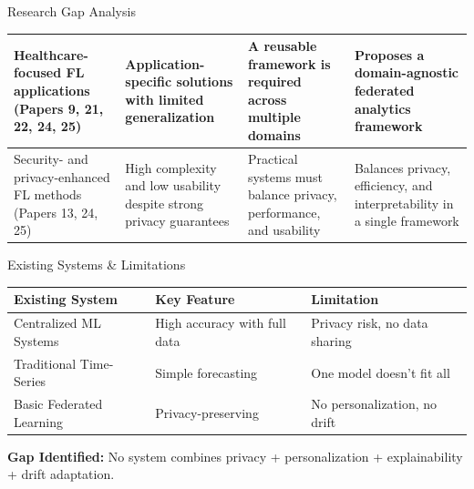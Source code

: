 \documentclass[aspectratio=169, 11pt]{beamer}
\begin{document}
\begin{frame}{Research Gap Analysis}
{\begin{tabular}{p{3.8cm}p{4.2cm}p{4.4cm}p{4.2cm}}
\midrule
Healthcare-focused FL applications
(Papers 9, 21, 22, 24, 25) &
Application-specific solutions with limited generalization &
A reusable framework is required across multiple domains &
Proposes a domain-agnostic federated analytics framework \\

\midrule
Security- and privacy-enhanced FL methods
(Papers 13, 24, 25) &
High complexity and low usability despite strong privacy guarantees &
Practical systems must balance privacy, performance, and usability &
Balances privacy, efficiency, and interpretability in a single framework \\

\bottomrule
\end{tabular}
}
\end{frame}

\begin{frame}{Existing Systems \& Limitations}
    \begin{table}
        \centering
        \begin{tabular}{l l l}
            \toprule
            \textbf{Existing System} & \textbf{Key Feature} & \textbf{Limitation} \\
            \midrule
            Centralized ML Systems & High accuracy with full data & Privacy risk, no data sharing \\
            Traditional Time-Series & Simple forecasting & One model doesn't fit all \\
            Basic Federated Learning & Privacy-preserving & No personalization, no drift \\
            \bottomrule
        \end{tabular}
    \end{table}

    \vspace{0.5cm}
    \textbf{Gap Identified:} No system combines privacy + personalization + explainability + drift adaptation.
\end{frame}

\end{document}
